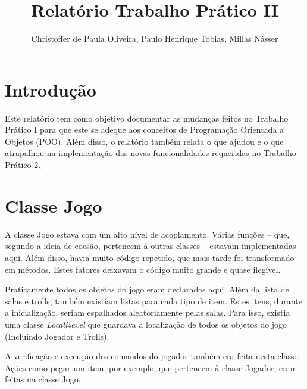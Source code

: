 \documentclass[runningheads,a4paper]{llncs}
\begin{document}
\mainmatter 

\title{Relatório Trabalho Prático II}


\author{Christoffer de Paula Oliveira, Paulo Henrique Tobias, Millas Násser}



\tocauthor{{}}

\maketitle

\medskip

\begingroup
\let\clearpage\relax
\tableofcontents
{}
\endgroup

\medskip
\medskip

\section*{Introdução}
    Este relatório tem como objetivo documentar as mudanças feitos no Trabalho Prático I para que este se adeque aos conceitos de Programação Orientada a Objetos (POO). Além disso, o relatório também relata o que ajudou e o que atrapalhou na implementação das novas funcionalidades requeridas no Trabalho Prático 2.

\section{Classe Jogo}
    A classe Jogo estava com um alto nível de acoplamento. Várias funções -- que, segundo a ideia de coesão, pertencem à outras classes -- estavam implementadas aqui. Além disso, havia muito código repetido, que mais tarde foi transformado em métodos. Estes fatores deixavam o código muito grande e quase ilegível.
    
    Praticamente todos os objetos do jogo eram declarados aqui. Além da lista de salas e trolls, também existiam listas para cada tipo de item. Estes itens, durante a inicialização, seriam espalhados aleatoriamente pelas salas. Para isso, existia uma classe \emph{Localizavel} que guardava a localização de todos os objetos do jogo (Incluindo Jogador e Trolls).

    A verificação e execução dos comandos do jogador também era feita nesta classe. Ações como pegar um item, por exemplo, que pertencem à classe Jogador, eram feitas na classe Jogo.
\end{document}
